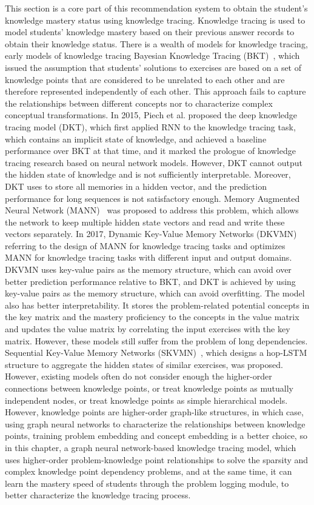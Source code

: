 This section is a core part of this recommendation system to obtain the student's knowledge mastery status using knowledge tracing. Knowledge tracing is used to model students' knowledge mastery based on their previous answer records to obtain their knowledge status. There is a wealth of models for knowledge tracing, early models of knowledge tracing Bayesian Knowledge Tracing (BKT)~\cite{yudelson2013individualized}, which issued the assumption that students' solutions to exercises are based on a set of knowledge points that are considered to be unrelated to each other and are therefore represented independently of each other. This approach fails to capture the relationships between different concepts nor to characterize complex conceptual transformations. In 2015, Piech et al. proposed the deep knowledge tracing model (DKT), which first applied RNN to the knowledge tracing task, which contains an implicit state of knowledge, and achieved a baseline performance over BKT at that time, and it marked the prologue of knowledge tracing research based on neural network models. However, DKT cannot output the hidden state of knowledge and is not sufficiently interpretable.
Moreover, DKT uses to store all memories in a hidden vector, and the prediction performance for long sequences is not satisfactory enough. Memory Augmented Neural Network (MANN)~\cite{santoro2016meta} was proposed to address this problem, which allows the network to keep multiple hidden state vectors and read and write these vectors separately. In 2017, Dynamic Key-Value Memory Networks (DKVMN)~\cite{zhang2017dynamic} referring to the design of MANN for knowledge tracing tasks and optimizes MANN for knowledge tracing tasks with different input and output domains. DKVMN uses key-value pairs as the memory structure, which can avoid over better prediction performance relative to BKT, and DKT is achieved by using key-value pairs as the memory structure, which can avoid overfitting. The model also has better interpretability. It stores the problem-related potential concepts in the key matrix and the mastery proficiency to the concepts in the value matrix and updates the value matrix by correlating the input exercises with the key matrix. However, these models still suffer from the problem of long dependencies. Sequential Key-Value Memory Networks (SKVMN)~\cite{Abdelrahman_2019}, which designs a hop-LSTM structure to aggregate the hidden states of similar exercises, was proposed. However, existing models often do not consider enough the higher-order connections between knowledge points, or treat knowledge points as mutually independent nodes, or treat knowledge points as simple hierarchical models. However, knowledge points are higher-order graph-like structures, in which case, using graph neural networks to characterize the relationships between knowledge points, training problem embedding and concept embedding is a better choice, so in this chapter, a graph neural network-based knowledge tracing model, which uses higher-order problem-knowledge point relationships to solve the sparsity and complex knowledge point dependency problems, and at the same time, it can learn the mastery speed of students through the problem logging module, to better characterize the knowledge tracing process.

